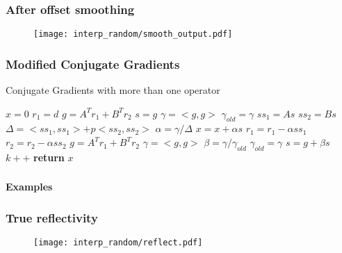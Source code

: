 \begin{frame}
\frametitle{After offset smoothing}
\begin{figure} 
\texttt{[image: interp\_random/smooth\_output.pdf]} \\
\end{figure} 
\end{frame}

\begin{frame}
\frametitle{Modified Conjugate Gradients}
\begin{algorithm}[H]
\renewcommand{\thealgorithm}{}
\tiny
\caption{Conjugate Gradients with more than one operator}\label{CG}
\begin{algorithmic}
   \State $x=0$ 
   \State $r_1=d$ 
   \State $g=A^Tr_1 + B^Tr_2$ 
   \State $s=g$ 
   \State $\gamma = <g,g>$
   \State $\gamma_{old} = \gamma$
      \State $ss_1 = As$
      \State $ss_2 = Bs$
      \State $\Delta = <ss_1,ss_1> + p<ss_2,ss_2>$
      \State $\alpha = \gamma / \Delta$
      \State $x = x + \alpha s$
      \State $r_1 = r_1 - \alpha ss_1$
      \State $r_2 = r_2 - \alpha ss_2$
      \State $g = A^Tr_1 + B^Tr_2$
      \State $\gamma = <g,g>$
      \State $\beta = \gamma/\gamma_{old}$
      \State $\gamma_{old} = \gamma$
      \State $s = g + \beta s$
      \State $k++$
   \EndWhile\label{euclidendwhile}
   \State \textbf{return} $x$
\EndProcedure
\end{algorithmic}
\end{algorithm}
\end{frame}

\begin{frame} \frametitle{ }
	\begin{center}
        \LARGE {\bf Examples}
	\end{center}
\end{frame}

\begin{frame}
\frametitle{True reflectivity\\}
\begin{figure} 
\texttt{[image: interp\_random/reflect.pdf]} \\
\end{figure} 
\end{frame}

